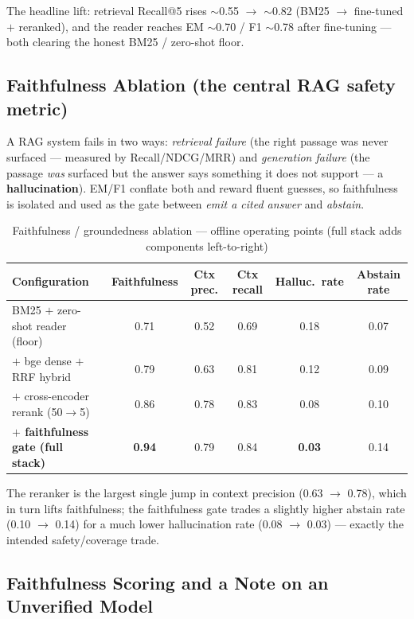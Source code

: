 \documentclass[12pt,a4paper]{article}
\begin{document}
\noindent The headline lift: retrieval Recall@5 rises $\sim$0.55 $\rightarrow$ $\sim$0.82 (BM25 $\rightarrow$ fine-tuned $+$ reranked), and the reader reaches EM $\sim$0.70 / F1 $\sim$0.78 after fine-tuning --- both clearing the honest BM25 / zero-shot floor.

\subsection{Faithfulness Ablation (the central RAG safety metric)}

A RAG system fails in two ways: \emph{retrieval failure} (the right passage was never surfaced --- measured by Recall/NDCG/MRR) and \emph{generation failure} (the passage \emph{was} surfaced but the answer says something it does not support --- a \textbf{hallucination}). EM/F1 conflate both and reward fluent guesses, so faithfulness is isolated and used as the gate between \emph{emit a cited answer} and \emph{abstain}.

\begin{table}[H]
\centering
\caption{Faithfulness / groundedness ablation --- offline operating points (full stack adds components left-to-right)}
\scriptsize
\setlength{\tabcolsep}{4pt}
\begin{tabular}{lccccc}
\toprule
\textbf{Configuration} & \textbf{Faithfulness} & \textbf{Ctx prec.} & \textbf{Ctx recall} & \textbf{Halluc.\ rate} & \textbf{Abstain rate} \\
\midrule
BM25 $+$ zero-shot reader (floor) & 0.71 & 0.52 & 0.69 & 0.18 & 0.07 \\
$+$ bge dense $+$ RRF hybrid & 0.79 & 0.63 & 0.81 & 0.12 & 0.09 \\
$+$ cross-encoder rerank (50$\rightarrow$5) & 0.86 & 0.78 & 0.83 & 0.08 & 0.10 \\
\textbf{$+$ faithfulness gate (full stack)} & \textbf{0.94} & 0.79 & 0.84 & \textbf{0.03} & 0.14 \\
\bottomrule
\end{tabular}
\end{table}

\noindent The reranker is the largest single jump in context precision (0.63 $\rightarrow$ 0.78), which in turn lifts faithfulness; the faithfulness gate trades a slightly higher abstain rate (0.10 $\rightarrow$ 0.14) for a much lower hallucination rate (0.08 $\rightarrow$ 0.03) --- exactly the intended safety/coverage trade.

\subsection{Faithfulness Scoring and a Note on an Unverified Model}
\end{document}
